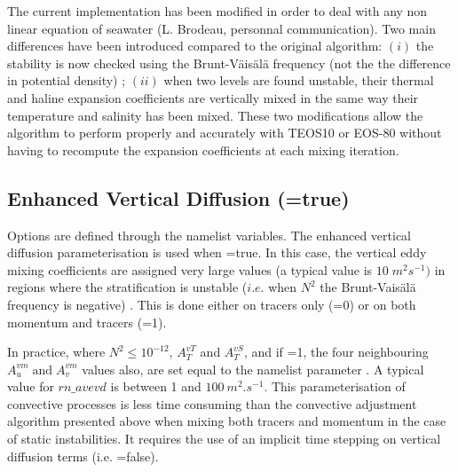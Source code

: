 \documentclass[NEMO_book]{subfiles}
\begin{document}
The current implementation has been modified in order to deal with any non linear 
equation of seawater (L. Brodeau, personnal communication). 
Two main differences have been introduced compared to the original algorithm: 
$(i)$ the stability is now checked using the Brunt-V\"{a}is\"{a}l\"{a} frequency 
(not the the difference in potential density) ; 
$(ii)$ when two levels are found unstable, their thermal and haline expansion coefficients 
are vertically mixed in the same way their temperature and salinity has been mixed.
These two modifications allow the algorithm to perform properly and accurately 
with TEOS10 or EOS-80 without having to recompute the expansion coefficients at each 
mixing iteration.

\subsection   [Enhanced Vertical Diffusion (\np{ln\_zdfevd})]
		     	  {Enhanced Vertical Diffusion (=true)}
\label{ZDF_evd}


Options are defined through the   namelist variables.
The enhanced vertical diffusion parameterisation is used when =true. 
In this case, the vertical eddy mixing coefficients are assigned very large values 
(a typical value is $10\;m^2s^{-1})$ in regions where the stratification is unstable 
($i.e.$ when $N^2$ the Brunt-Vais\"{a}l\"{a} frequency is negative) 
\citep{Lazar_PhD97, Lazar_al_JPO99}. This is done either on tracers only 
(=0) or on both momentum and tracers (=1).

In practice, where $N^2\leq 10^{-12}$, $A_T^{vT}$ and $A_T^{vS}$, and 
if =1, the four neighbouring $A_u^{vm} \;\mbox{and}\;A_v^{vm}$ 
values also, are set equal to the namelist parameter . A typical value 
for $rn\_avevd$ is between 1 and $100~m^2.s^{-1}$. This parameterisation of 
convective processes is less time consuming than the convective adjustment 
algorithm presented above when mixing both tracers and momentum in the 
case of static instabilities. It requires the use of an implicit time stepping on 
vertical diffusion terms (i.e. =false). 
\end{document}
